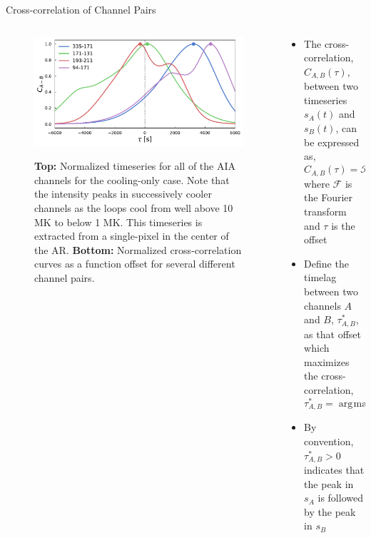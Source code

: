 \documentclass[final]{beamer}
\DeclareMathOperator*{\argmax}{\arg\!\max}
\begin{document}
\begin{frame}
\begin{columns}[T]
\begin{column}{0.49\linewidth}
\begin{block}{Cross-correlation of Channel Pairs}
\begin{columns}[T]
\begin{column}{0.49\columnwidth}
\begin{figure}
{                \includegraphics[width=\columnwidth]{figures/cooling_cross_correlations_1d.pdf}
                \label{fig:1d_correlations}}
                \caption{\textbf{Top:} Normalized timeseries for all of the AIA channels for the cooling-only case. Note that the intensity peaks in successively cooler channels as the loops cool from well above 10 MK to below 1 MK. This timeseries is extracted from a single-pixel in the center of the AR. \textbf{Bottom:} Normalized cross-correlation curves as a function offset for several different channel pairs. }
            \end{figure}
            \end{column}
            \begin{column}{0.49\columnwidth}
                \begin{itemize}
                    \item The cross-correlation, $C_{A,B}(\tau)$, between two timeseries $s_A(t)$ and $s_B(t)$, can be expressed as,
                    \begin{equation}
                        C_{A,B}(\tau) = \mathcal{F}^{-1}\{\mathcal{F}\{s_A(-t)\}\mathcal{F}\{s_B(t)\}\}
                    \end{equation}
                    where $\mathcal{F}$ is the Fourier transform and $\tau$ is the offset
                    \item Define the \alert{timelag} between two channels $A$ and $B$, $\tau^*_{A,B}$, as that offset which maximizes the cross-correlation,
                    \begin{equation}
                        \tau^*_{A,B} = \argmax_{\tau}C_{AB}(\tau)
                    \end{equation}
                    \item By convention, $\tau^*_{A,B}>0$ indicates that the peak in $s_A$ is followed by the peak in $s_B$

\end{itemize}
\end{column}
\end{columns}
\end{block}
\end{column}
\end{columns}
\end{frame}
\end{document}
